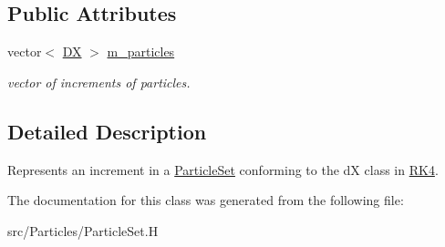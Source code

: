 \subsection*{Public Attributes}
\begin{DoxyCompactItemize}
\item 
\mbox{\label{class_particle_shift_ace15f1432744690f40f43fe2a5016e64}} 
vector$<$ \hyperlink{class_d_x}{DX} $>$ \hyperlink{class_particle_shift_ace15f1432744690f40f43fe2a5016e64}{m\+\_\+particles}
\begin{DoxyCompactList}\small\item\em vector of increments of particles. \end{DoxyCompactList}\end{DoxyCompactItemize}


\subsection{Detailed Description}
Represents an increment in a \hyperlink{class_particle_set}{Particle\+Set} conforming to the dX class in \hyperlink{class_r_k4}{R\+K4}. 

The documentation for this class was generated from the following file\+:\begin{DoxyCompactItemize}
\item 
src/\+Particles/Particle\+Set.\+H\end{DoxyCompactItemize}
